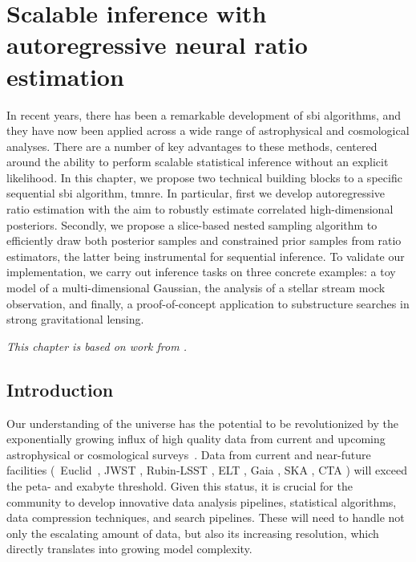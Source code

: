 
\chapter{Scalable inference with autoregressive neural ratio estimation} \label{cha:anre}

In recent years, there has been a remarkable development of \gls*{sbi} algorithms, and they have now been applied across a wide range of astrophysical and cosmological analyses. There are a number of key advantages to these methods, centered around the ability to perform scalable statistical inference without an explicit likelihood. In this chapter, we propose two technical building blocks to a specific sequential \gls*{sbi} algorithm, \gls*{tmnre}. In particular, first we develop autoregressive ratio estimation with the aim to robustly estimate correlated high-dimensional posteriors. Secondly, we propose a slice-based nested sampling algorithm to efficiently draw both posterior samples and constrained prior samples from ratio estimators, the latter being instrumental for sequential inference. To validate our implementation, we carry out inference tasks on three concrete examples: a toy model of a multi-dimensional Gaussian, the analysis of a stellar stream mock observation, and finally, a proof-of-concept application to substructure searches in strong gravitational lensing. 

\textit{This chapter is based on work from \cite{AnauMontel:2023stj}.}


\section{Introduction} \label{sec:anre-intro}

 Our understanding of the universe has the potential to be revolutionized by the exponentially growing influx of high quality data from current and upcoming astrophysical or cosmological surveys~\cite{DiValentino:2020vhf}. Data from current and near-future facilities (\eg~Euclid~\cite{EUCLID:2011zbd}, JWST \cite{Gardner:2006ky}, Rubin-LSST \cite{LSSTDarkEnergyScience:2012kar}, ELT \cite{Neichel:2018aa}, Gaia \cite{Prusti:2016aa}, SKA \cite{Lazio:2009aa}, CTA \cite{Knodlseder:2020onx}) will exceed the peta- and exabyte threshold. Given this status, it is crucial for the community to develop innovative data analysis pipelines, statistical algorithms, data compression techniques, and search pipelines. These will need to handle not only the escalating amount of data, but also its increasing resolution, which directly translates into growing model complexity.

